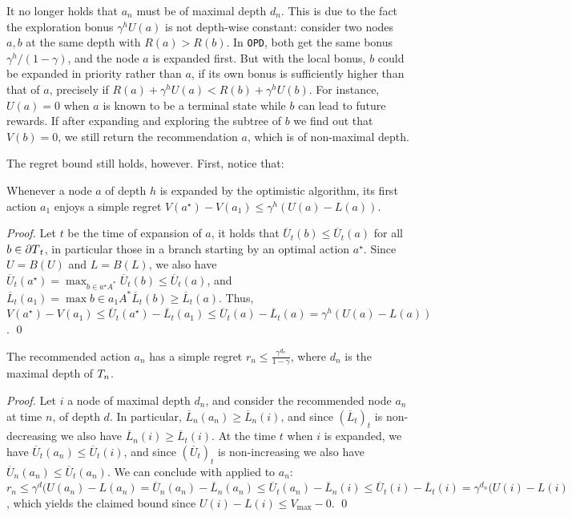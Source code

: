 \documentclass[runningheads]{llncs}
\begin{document}
\begin{remark}
It no longer holds that $a_n$ must be of maximal depth $d_n$.  This is due to the fact the exploration bonus $\gamma^h U(a)$ is not depth-wise constant: consider two nodes $a,b$ at the same depth with $R(a) > R(b)$. In \texttt{OPD}, both get the same bonus $\gamma^h/(1-\gamma)$, and the node $a$ is expanded first. But with the local bonus, $b$ could be expanded in priority rather than $a$, if its own bonus is sufficiently higher than that of $a$, precisely if $R(a)+\gamma^h U(a) < R(b)+\gamma^h U(b)$. For instance, $U(a)=0$ when $a$ is known to be a terminal state while $b$ can lead to future rewards. If after expanding and exploring the subtree of $b$ we find out that $V(b) = 0$, we still return the recommendation $a$, which is of non-maximal depth.
\end{remark}

The regret bound still holds, however. First, notice that:
\begin{lemma}[Expansion]
\label{lem:expansion-bound-U}
Whenever a node $a$ of depth $h$ is expanded by the optimistic algorithm, its first action $a_1$ enjoys a simple regret $V(a^\star)-V(a_1) \leq \gamma^h(U(a)-L(a))$. 
\end{lemma}
\begin{proof}
Let $t$ be the time of expansion of $a$, it holds that $\overline{U}_t(b) \leq \overline{U}_t(a)$ for all $b\in {\partial T}_t$, in particular those in a branch starting by an optimal action $a^\star$. Since $U=B(U)$ and $L=B(L)$, we also have $\overline{U}_t(a^\star) = \max_{b\in a^\star A^*} \overline{U}_t(b) \leq \overline{U}_t(a)$, and $\overline{L}_t(a_1) = \max{b\in a_1 A^*} \overline{L}_t(b) \geq  \overline{L}_t(a)$. Thus, $V(a^\star)-V(a_1) \leq \overline{U}_t(a^\star) - \overline{L}_t(a_1) \leq \overline{U}_t(a) - \overline{L}_t(a) = \gamma^h(U(a)-L(a))$.
\qed\end{proof}
 
\begin{lemma}[Recommendation]
	\label{lem:recommendation-bound-U}
The recommended action $a_n$ has a simple regret $r_n \leq \frac{\gamma^{d_n}}{1-\gamma}$, where $d_n$ is the maximal depth of $T_n$.
\end{lemma}
\begin{proof}
Let $i$ a node of maximal depth $d_n$, and consider the recommended node $a_n$ at time $n$, of depth $d$. In particular, $\overline{L}_n(a_n) \geq \overline{L}_n(i)$, and since $(\overline{L}_t)_t$ is non-decreasing we also have $\overline{L}_n(i) \geq \overline{L}_t(i)$. At the time $t$ when $i$ is expanded, we have $\overline{U}_t(a_n) \leq \overline{U}_t(i)$, and since $(\overline{U}_t)_t$ is non-increasing we also have $\overline{U}_n(a_n) \leq \overline{U}_t(a_n)$. We can conclude with  applied to $a_n$: $r_n \leq \gamma^d(U(a_n)-L(a_n) = \overline{U}_n(a_n) - \overline{L}_n(a_n)  \leq \overline{U}_t(a_n) - \overline{L}_n(i) \leq \overline{U}_t(i) - \overline{L}_t(i) = \gamma^{d_n}(U(i) - L(i)$, which yields the claimed bound since $U(i) - L(i) \leq V_{\max}-0$.
\qed\end{proof}
\end{document}
